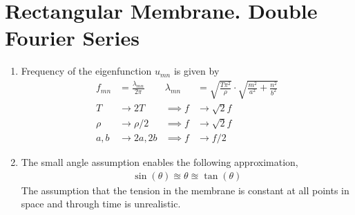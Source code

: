 \section{Rectangular Membrane. Double Fourier Series}

\begin{enumerate}
    \item Frequency of the eigenfunction $ u_{mn} $ is given by
          \begin{align}
              f_{mn}       & = \frac{\lambda_{mn}}{2\pi}        &
              \lambda_{mn} & = \sqrt{\frac{T\pi^2}{\rho}} \cdot
              \sqrt{\frac{m^2}{a^2} + \frac{n^2}{b^2}}            \\
              T            & \to 2T                             &
              \implies f   & \to \sqrt{2} f                       \\
              \rho         & \to \rho/2                         &
              \implies f   & \to \sqrt{2} f                       \\
              a,b          & \to 2a, 2b                         &
              \implies f   & \to  f/2
          \end{align}

    \item The small angle assumption enables the following approximation,
          \begin{align}
              \sin(\theta) \approxeq \theta \approxeq \tan(\theta)
          \end{align}
          The assumption that the tension in the membrane is constant at all points
          in space and through time is unrealistic.


\end{enumerate}
